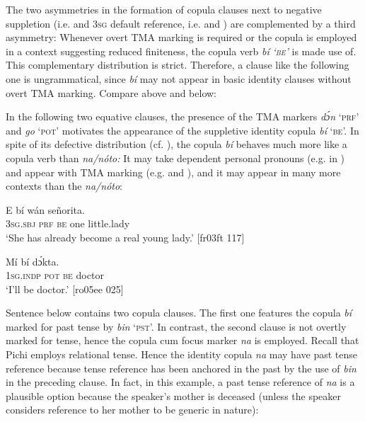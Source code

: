 The two asymmetries in the formation of copula clauses next to negative suppletion (i.e.  and \textsc{3sg} default reference, i.e.  and ) are complemented by a third asymmetry: Whenever overt \textsc{TMA} marking is required or the copula is employed in a context suggesting reduced finiteness, the copula verb \textit{bí} \textit{\textsc{‘be’}} is made use of. This complementary distribution is strict. Therefore, a clause like the following one is ungrammatical, since \textit{bí} may not appear in basic identity clauses without overt TMA marking. Compare  above and  below: 



\z

In the following two equative clauses, the presence of the \textsc{TMA} markers \textit{dɔ́n} ‘\textsc{prf}’  and \textit{go} ‘\textsc{pot}’  motivates the appearance of the suppletive identity copula \textit{bí} ‘\textsc{be’.} In spite of its defective distribution (cf. ), the copula \textit{bí} behaves much more like a copula verb than \textit{na}\textit{\textup{/}}\textit{nóto:} It may take dependent personal pronouns (e.g. in ) and appear with TMA marking (e.g.  and ), and it may appear in many more contexts than the \textit{na}\textit{\textup{/}}\textit{nóto}: 


\ea%
    \label{ex:key:771}
    \gll E\textstylePichiexamplebold{}     bí  wán    señorita.\\
\textsc{3sg.sbj}  \textsc{prf}  \textsc{be}  one    little.lady\\

\glt ‘She has already become a real young lady.’ [fr03ft 117]
\z


\ea%
    \label{ex:key:772}
    \gll Mí      bí  dɔ́kta.\\
\textsc{1sg.indp}  \textsc{pot}  \textsc{be}  doctor\\

\glt ‘I’ll be doctor.’ [ro05ee 025]
\z

Sentence  below contains two copula clauses. The first one features the copula \textit{bí} marked for past tense by \textit{bin} ‘\textsc{pst}’. In contrast, the second clause is not overtly marked for tense, hence the copula cum focus marker \textit{na} is employed. Recall that Pichi employs relational tense. Hence the identity copula \textit{na} may have past tense reference because tense reference has been anchored in the past by the use of \textit{bin} in the preceding clause. In fact, in this example, a past tense reference of \textit{na} is a plausible option because the speaker’s mother is deceased (unless the speaker considers reference to her mother to be generic in nature): 


